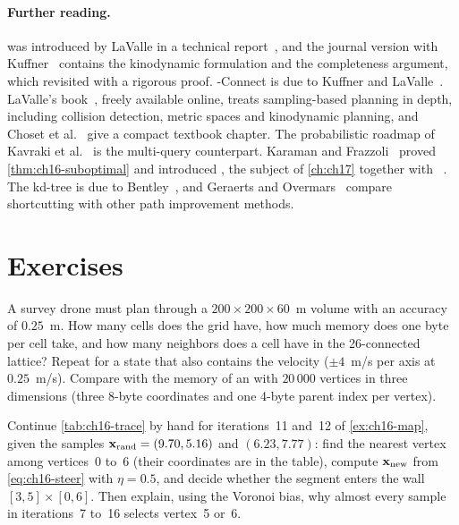 \paragraph{Further reading.}
\rrt was introduced by LaValle in a technical report~\cite{lavalle1998rrt},
and the journal version with Kuffner~\cite{lavalle2001randomized} contains
the kinodynamic formulation and the completeness argument, which
\textcite{kleinbort2019completeness} revisited with a rigorous proof.
\rrt-Connect is due to Kuffner and LaValle~\cite{kuffner2000rrtconnect}.
LaValle's book~\cite{lavalle2006planning}, freely available online, treats
sampling-based planning in depth, including collision detection, metric
spaces and kinodynamic planning, and Choset et
al.~\cite{choset2005principles} give a compact textbook chapter. The
probabilistic roadmap of Kavraki et al.~\cite{kavraki1996prm} is the
multi-query counterpart. Karaman and Frazzoli~\cite{karaman2011sampling}
proved \cref{thm:ch16-suboptimal} and introduced \rrtstar, the subject of
\cref{ch:ch17} together with \irrtstar~\cite{gammell2014informed}. The
kd-tree is due to Bentley~\cite{bentley1975kdtree}, and Geraerts and
Overmars~\cite{geraerts2007creating} compare shortcutting with other path
improvement methods.

\section{Exercises}
\label{sec:ch16-exercises}

\begin{exercise}[\difficulty{1}]
\label{exr:ch16-gridsizes}
A survey drone must plan through a $200\times200\times60$~m volume with an
accuracy of $0.25$~m. How many cells does the grid have, how much memory
does one byte per cell take, and how many neighbors does a cell have in the
26-connected lattice? Repeat for a state that also contains the velocity
($\pm4$~m/s per axis at $0.25$~m/s). Compare with the memory of an \rrt with
$20\,000$ vertices in three dimensions (three 8-byte coordinates and one
4-byte parent index per vertex).
\end{exercise}

\begin{exercise}[\difficulty{1}]
\label{exr:ch16-trace}
Continue \cref{tab:ch16-trace} by hand for iterations~11 and~12 of
\cref{ex:ch16-map}, given the samples $\mathbf{x}_{\mathrm{rand}}=(9.70,5.16)$ and
$(6.23,7.77)$: find the nearest vertex among vertices~0 to~6 (their
coordinates are in the table), compute $\mathbf{x}_{\mathrm{new}}$ from
\cref{eq:ch16-steer} with $\eta=0.5$, and decide whether the segment enters
the wall $[3,5]\times[0,6]$. Then explain, using the Voronoi bias, why
almost every sample in iterations~7 to~16 selects vertex~5 or~6.
\end{exercise}

